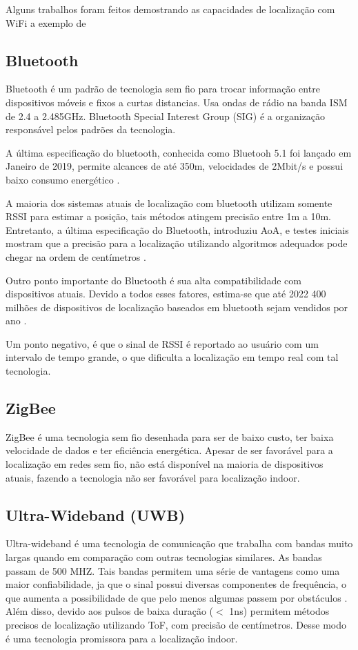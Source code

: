 Alguns trabalhos foram feitos demostrando as capacidades de localização com WiFi a exemplo de \cite{art7}

\subsection{Bluetooth}
Bluetooth é um padrão de tecnologia sem fio para trocar informação entre dispositivos móveis e fixos a curtas distancias. Usa ondas de rádio na banda ISM de 2.4 a 2.485GHz. Bluetooth Special Interest Group (SIG) é a organização responsável pelos padrões da tecnologia.

A última especificação do bluetooth, conhecida como Bluetooh 5.1 foi lançado em Janeiro de 2019, permite alcances de até 350m, velocidades de 2Mbit/s e possui baixo consumo energético \cite{art8}.

A maioria dos sistemas atuais de localização com bluetooth utilizam somente RSSI para estimar a posição, tais métodos atingem precisão entre 1m a 10m. Entretanto, a última especificação do Bluetooth, introduziu AoA, e testes iniciais mostram que a precisão para a localização utilizando algoritmos adequados pode chegar na ordem de centímetros \cite{art9}.

Outro ponto importante do Bluetooth é sua alta compatibilidade com dispositivos atuais. Devido a todos esses fatores, estima-se que até 2022 400 milhões de dispositivos de localização baseados em bluetooth sejam vendidos por ano \cite{art9}.

Um ponto negativo, é que o sinal de RSSI é reportado ao usuário com um intervalo de tempo grande, o que dificulta a localização em tempo real com tal tecnologia.

\subsection{ZigBee}

ZigBee é uma tecnologia sem fio desenhada para ser de baixo custo, ter baixa velocidade de dados e ter eficiência energética. Apesar de ser favorável para a localização em redes sem fio, não está disponível na maioria de dispositivos atuais, fazendo a tecnologia não ser favorável para localização indoor. \cite{art2}

\subsection{Ultra-Wideband (UWB)}
Ultra-wideband é uma tecnologia de comunicação que trabalha com bandas muito largas quando em comparação com outras tecnologias similares. As bandas passam de 500 MHZ. Tais bandas permitem uma série de vantagens como uma maior confiabilidade, ja que o sinal possui diversas componentes de frequência, o que aumenta a possibilidade de que pelo menos algumas passem por obstáculos \cite{art10}.
Além disso, devido aos pulsos de baixa duração (\(<\) 1ns) permitem métodos precisos de localização utilizando ToF, com precisão de centímetros. Desse modo é uma tecnologia promissora para a localização indoor.


